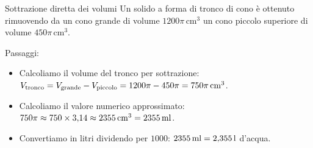 \begin{esercizio}{Sottrazione diretta dei volumi}
Un solido a forma di tronco di cono è ottenuto rimuovendo da un cono grande di volume $1200\pi\,\mathrm{cm^3}$ un cono piccolo superiore di volume $450\pi\,\mathrm{cm^3}$.


\responsespace{5.5cm}

\begin{soluzione}
  Passaggi:
  \begin{itemize}
    \item Calcoliamo il volume del tronco per sottrazione: $V_{\text{tronco}} = V_{\text{grande}} - V_{\text{piccolo}} = 1200\pi - 450\pi = 750\pi\,\mathrm{cm^3}$.
    \item Calcoliamo il valore numerico approssimato: $750\pi \approx 750 \times 3{,}14 \approx 2355\,\mathrm{cm^3} = 2355\,\mathrm{ml}$.
    \item Convertiamo in litri dividendo per $1000$: $2355\,\mathrm{ml} = 2{,}355\,\mathrm{l}$ d'acqua.
  \end{itemize}
\end{soluzione}
\end{esercizio}

\condnewpage


